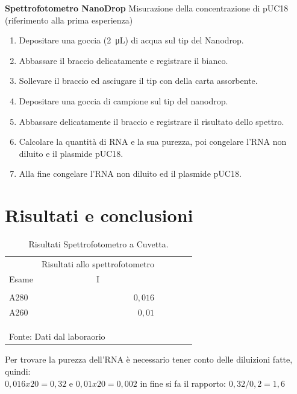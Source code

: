 \textbf{Spettrofotometro NanoDrop}
\vspace{0.5cm}
Misurazione della concentrazione di pUC18 (riferimento alla prima esperienza)
\begin{enumerate}
\item Depositare una goccia (\SI{2}{\micro\liter}) di acqua sul tip del Nanodrop.
\item Abbassare il braccio delicatamente e registrare il bianco.
\item Sollevare il braccio ed asciugare il tip con della carta assorbente.
\item Depositare una goccia di campione sul tip del nanodrop.
\item Abbassare delicatamente il braccio e registrare il risultato dello spettro.
\item Calcolare la quantità di RNA e la sua purezza, poi congelare l’RNA non diluito e il plasmide pUC18.
\item Alla fine congelare l'RNA non diluito ed il plasmide pUC18.
\end{enumerate}


\section{Risultati e conclusioni}
\begin{table}[H]
\begin{center}

\caption{Risultati Spettrofotometro a Cuvetta.}
\vspace{0,3cm}
\begin{tabular}{lrrrrr}
   & \multicolumn{1}{c}{Risultati allo spettrofotometro} \\
   Esame & \multicolumn{1}{c}{I} \\ \hline
    & & & & & \\

  A280 & $0,016$  \\
 A260 & $0,01$   \\ \\ \hline
       & & & & & \\
  & & & & &  \\ \multicolumn{6}{l}{\small Fonte: Dati dal laboraorio}
\end{tabular}

\end{center}
\end{table}

Per trovare la purezza dell'RNA \`e necessario tener conto delle diluizioni fatte, quindi:\\
$0,016 x 20 = 0,32$ e $0,01 x 20 = 0,002$ in fine si fa il rapporto: $0,32/0,2 = 1,6$

